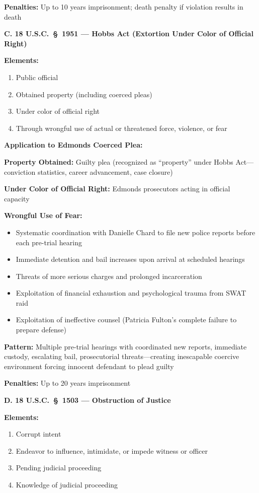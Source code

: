 \documentclass[11pt, letterpaper]{article}
\newcommand{\subsectiontitle}[1]{\vspace{0.15in}\noindent\textcolor{NavyBlue}{\textbf{#1}}\vspace{0.05in}}
\begin{document}
\textbf{Penalties:} Up to 10 years imprisonment; death penalty if violation results in death

\subsectiontitle{C. 18 U.S.C.\ \S\ 1951 --- Hobbs Act (Extortion Under Color of Official Right)}

\textbf{Elements:}
\begin{enumerate}[leftmargin=*,itemsep=2pt]
    \item Public official
    \item Obtained property (including coerced pleas)
    \item Under color of official right
    \item Through wrongful use of actual or threatened force, violence, or fear
\end{enumerate}

\textbf{Application to Edmonds Coerced Plea:}

\textbf{Property Obtained:} Guilty plea (recognized as ``property'' under Hobbs Act---conviction statistics, career advancement, case closure)

\textbf{Under Color of Official Right:} Edmonds prosecutors acting in official capacity

\textbf{Wrongful Use of Fear:}
\begin{itemize}[leftmargin=*,itemsep=2pt]
    \item Systematic coordination with Danielle Chard to file new police reports before each pre-trial hearing
    \item Immediate detention and bail increases upon arrival at scheduled hearings
    \item Threats of more serious charges and prolonged incarceration
    \item Exploitation of financial exhaustion and psychological trauma from SWAT raid
    \item Exploitation of ineffective counsel (Patricia Fulton's complete failure to prepare defense)
\end{itemize}

\textbf{Pattern:} Multiple pre-trial hearings with coordinated new reports, immediate custody, escalating bail, prosecutorial threats---creating inescapable coercive environment forcing innocent defendant to plead guilty

\textbf{Penalties:} Up to 20 years imprisonment

\subsectiontitle{D. 18 U.S.C.\ \S\ 1503 --- Obstruction of Justice}

\textbf{Elements:}
\begin{enumerate}[leftmargin=*,itemsep=2pt]
    \item Corrupt intent
    \item Endeavor to influence, intimidate, or impede witness or officer
    \item Pending judicial proceeding
    \item Knowledge of judicial proceeding
\end{enumerate}
\end{document}
